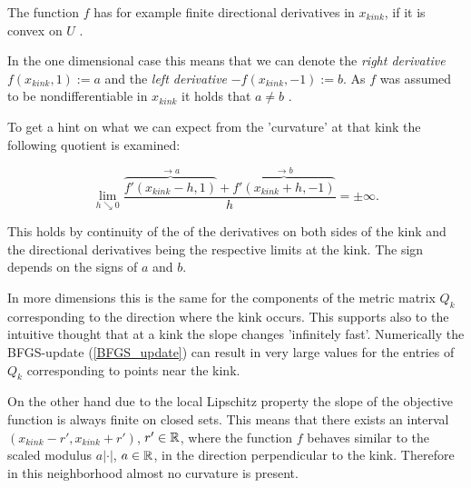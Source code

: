 The function \(f\) has for example finite directional derivatives in \(x_{{kink}}\), if it is convex on \(U\) \cite[p. 144]{Stoer1970}.

In the one dimensional case this means that we can denote the \emph{right derivative} \(f(x_{{kink}},1) := a\) and the \emph{left derivative} \(-f(x_{{kink}},-1) := b\). As \(f\) was assumed to be nondifferentiable in \(x_{{kink}}\) it holds that \(a \neq b\) \cite[p. 213]{Rockafellar1970}.



To get a hint on what we can expect from the 'curvature' at that kink the following quotient is examined:


\[ \lim_{h \searrow 0} \frac{\overbrace{f'(x_{{kink}}-h,1)}^{\to a}+\overbrace{f'(x_{{kink}}+h,-1)}^{\to b}}{h} = \pm \infty. \]

This holds by continuity of the of the derivatives on both sides of the kink and the directional derivatives being the respective limits at the kink.
The sign depends on the signs of \(a\) and \(b\). 

In more dimensions this is the same for the components of the metric matrix \(Q_k\) corresponding to the direction where the kink occurs. This supports also to the intuitive thought that at a kink the slope changes 'infinitely fast'.
Numerically the BFGS-update (\ref{BFGS_update}) can result in very large values for the entries of \(Q_k\) corresponding to points near the kink.

On the other hand due to the local Lipschitz property the slope of the objective function is always finite on closed sets. This means that there exists an interval \((x_{{kink}}-r',x_{{kink}}+r')\), \(r' \in \mathbb{R}\), where the function \(f\) behaves similar to the scaled modulus \(a|\cdot|\), \(a \in \mathbb{R}\), in the direction perpendicular to the kink. Therefore in this neighborhood almost no curvature is present.

